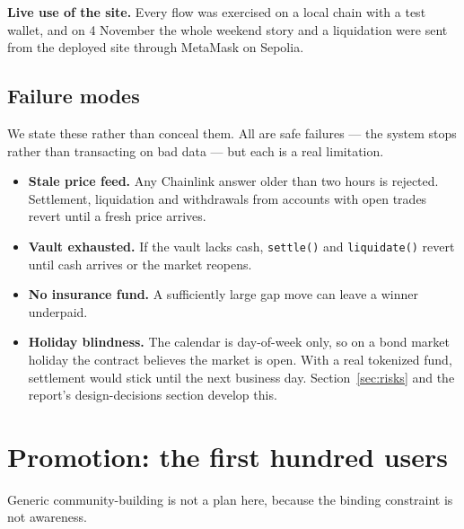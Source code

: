 \documentclass[11pt,a4paper]{article}
\begin{document}
\textbf{Live use of the site.} Every flow was exercised on a local chain with a test wallet, and on
4 November the whole weekend story and a liquidation were sent from the deployed site through
MetaMask on Sepolia.

\subsection{Failure modes}

We state these rather than conceal them. All are safe failures — the system stops rather than
transacting on bad data — but each is a real limitation.

\begin{itemize}
  \item \textbf{Stale price feed.} Any Chainlink answer older than two hours is rejected. Settlement,
  liquidation and withdrawals from accounts with open trades revert until a fresh price arrives.
  \item \textbf{Vault exhausted.} If the vault lacks cash, \texttt{settle()} and \texttt{liquidate()}
  revert until cash arrives or the market reopens.
  \item \textbf{No insurance fund.} A sufficiently large gap move can leave a winner underpaid.
  \item \textbf{Holiday blindness.} The calendar is day-of-week only, so on a bond market holiday the
  contract believes the market is open. With a real tokenized fund, settlement would stick until the
  next business day. Section~\ref{sec:risks} and the report's design-decisions section develop this.
\end{itemize}

\section{Promotion: the first hundred users}

Generic community-building is not a plan here, because the binding constraint is not awareness.
\end{document}
